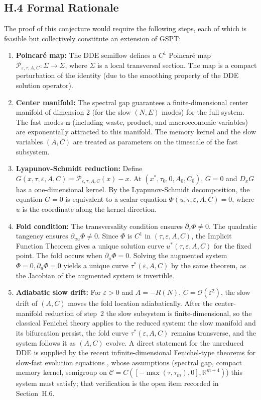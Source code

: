 \documentclass[twocolumn,10pt]{article}
\begin{document}
\subsection{H.4 Formal Rationale}
The proof of this conjecture would require the following steps, each of which is feasible but collectively constitute an extension of GSPT:
\begin{enumerate}
    \item \textbf{Poincaré map:} The DDE semiflow defines a $C^1$ Poincaré map $\mathcal{P}_{\varepsilon,\tau,A,C}: \Sigma \to \Sigma$, where $\Sigma$ is a local transversal section. The map is a compact perturbation of the identity (due to the smoothing property of the DDE solution operator).
    \item \textbf{Center manifold:} The spectral gap guarantees a finite-dimensional center manifold of dimension 2 \cite{mielke1986} (for the slow $(N,E)$ modes) for the full system. The fast modes $\mathbf{n}$ (including waste, product, and macroeconomic variables) are exponentially attracted to this manifold. The memory kernel and the slow variables $(A, C)$ are treated as parameters on the timescale of the fast subsystem.
    \item \textbf{Lyapunov-Schmidt reduction:} Define $G(x, \tau, \varepsilon, A, C) = \mathcal{P}_{\varepsilon,\tau,A,C}(x) - x$. At $(x^*, \tau_0, 0, A_0, C_0)$, $G = 0$ and $D_x G$ has a one-dimensional kernel. By the Lyapunov-Schmidt decomposition, the equation $G = 0$ is equivalent to a scalar equation $\Phi(u, \tau, \varepsilon, A, C) = 0$, where $u$ is the coordinate along the kernel direction.
    \item \textbf{Fold condition:} The transversality condition ensures $\partial_\tau \Phi \neq 0$. The quadratic tangency ensures $\partial_{uu} \Phi \neq 0$. Since $\Phi$ is $C^1$ in $(\tau, \varepsilon, A, C)$, the Implicit Function Theorem gives a unique solution curve $u^*(\tau, \varepsilon, A, C)$ for the fixed point. The fold occurs when $\partial_u \Phi = 0$. Solving the augmented system $\Phi = 0, \partial_u \Phi = 0$ yields a unique curve $\tau^*(\varepsilon, A, C)$ by the same theorem, as the Jacobian of the augmented system is invertible.
    \item \textbf{Adiabatic slow drift:} For $\varepsilon > 0$ and $\dot{A} = -R(N)$, $\dot{C} = \mathcal{O}(\varepsilon^2)$, the slow drift of $(A, C)$ moves the fold location adiabatically. After the center-manifold reduction of step~2 the slow subsystem is finite-dimensional, so the classical Fenichel theory \cite{fenichel1971,fenichel1979} applies to the reduced system: the slow manifold and its bifurcation persist, the fold curve $\tau^*(\varepsilon, A, C)$ remains transverse, and the system follows it as $(A, C)$ evolve. A direct statement for the unreduced DDE is supplied by the recent infinite-dimensional Fenichel-type theorems for slow-fast evolution equations \cite{hummelkuehn2022,kuehnsulzbach2024}, whose assumptions (spectral gap, compact memory kernel, semigroup on $\mathcal{C}=C([-\max(\tau,\tau_m),0],\mathbb R^{m+4})$) this system must satisfy; that verification is the open item recorded in Section~H.6.
\end{enumerate}
\end{document}
